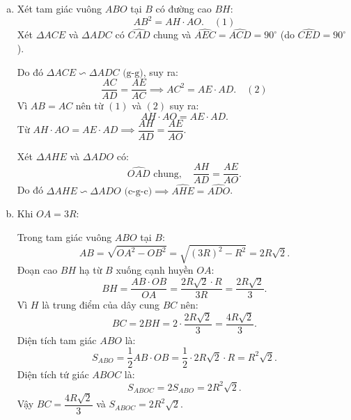 \begin{bt}
{\begin{enumerate}[a)]
			Vì $AB = AC$ và $OB = OC = R$ nên $OA$ là đường trung trực của $BC \implies OA \perp BC$ tại $H$.
			
			Mặt khác $\widehat{DBC} = 90^\circ$ (góc nội tiếp chắn nửa đường tròn đường kính $CD$) $\implies BD \perp BC$.
			
			Từ đó suy ra $BD \parallel OA$ (vì cùng vuông góc với $BC$).
			\item Xét tam giác vuông $ABO$ tại $B$ có đường cao $BH$:
			$$AB^2 = AH \cdot AO. \quad (1)$$
			Xét $\Delta ACE$ và $\Delta ADC$ có $\widehat{CAD}$ chung và $\widehat{AEC} = \widehat{ACD} = 90^\circ$ (do $\widehat{CED} = 90^\circ$).
			
			Do đó $\Delta ACE \backsim \Delta ADC\text{ (g-g)}$, suy ra:
			$$\dfrac{AC}{AD} = \dfrac{AE}{AC} \implies AC^2 = AE \cdot AD. \quad (2)$$
			Vì $AB = AC$ nên từ $(1)$ và $(2)$ suy ra:
			$$AH \cdot AO = AE \cdot AD.$$
			Từ $AH \cdot AO = AE \cdot AD \implies \dfrac{AH}{AD} = \dfrac{AE}{AO}$.
			
			Xét $\Delta AHE$ và $\Delta ADO$ có:
			$$\widehat{OAD}\text{ chung},\quad \dfrac{AH}{AD} = \dfrac{AE}{AO}.$$
			Do đó $\Delta AHE \backsim \Delta ADO\text{ (c-g-c)} \implies \widehat{AHE} = \widehat{ADO}$.
			\item Khi $OA = 3R$:
			
			Trong tam giác vuông $ABO$ tại $B$:
			$$AB = \sqrt{OA^2 - OB^2} = \sqrt{(3R)^2 - R^2} = 2R\sqrt{2}.$$
			Đoạn cao $BH$ hạ từ $B$ xuống cạnh huyền $OA$:
			$$BH = \dfrac{AB \cdot OB}{OA} = \dfrac{2R\sqrt{2} \cdot R}{3R} = \dfrac{2R\sqrt{2}}{3}.$$
			Vì $H$ là trung điểm của dây cung $BC$ nên:
			$$BC = 2BH = 2 \cdot \dfrac{2R\sqrt{2}}{3} = \dfrac{4R\sqrt{2}}{3}.$$
			Diện tích tam giác $ABO$ là:
			$$S_{ABO} = \dfrac{1}{2} AB \cdot OB = \dfrac{1}{2} \cdot 2R\sqrt{2} \cdot R = R^2\sqrt{2}.$$
			Diện tích tứ giác $ABOC$ là:
			$$S_{ABOC} = 2S_{ABO} = 2R^2\sqrt{2}.$$
			Vậy $BC = \dfrac{4R\sqrt{2}}{3}$ và $S_{ABOC} = 2R^2\sqrt{2}$.
		\end{enumerate}
	}
\end{bt}


